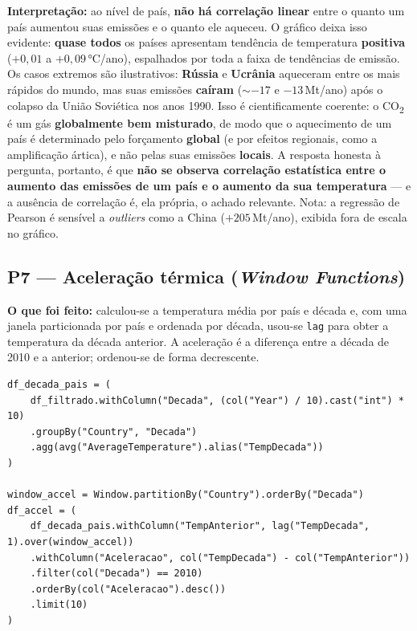 \textbf{Interpretação:} ao nível de país, \textbf{não há correlação linear} entre o quanto
um país aumentou suas emissões e o quanto ele aqueceu. O gráfico deixa isso evidente:
\textbf{quase todos} os países apresentam tendência de temperatura \textbf{positiva}
($+0{,}01$ a $+0{,}09$\,°C/ano), espalhados por toda a faixa de tendências de emissão.
Os casos extremos são ilustrativos: \textbf{Rússia} e \textbf{Ucrânia} aqueceram entre os
mais rápidos do mundo, mas suas emissões \textbf{caíram} ($\sim$$-17$ e $-13$\,Mt/ano)
após o colapso da União Soviética nos anos 1990. Isso é cientificamente coerente: o
CO\textsubscript{2} é um gás \textbf{globalmente bem misturado}, de modo que o aquecimento
de um país é determinado pelo forçamento \textbf{global} (e por efeitos regionais, como a
amplificação ártica), e não pelas suas emissões \textbf{locais}. A resposta honesta à
pergunta, portanto, é que \textbf{não se observa correlação estatística entre o aumento das
emissões de um país e o aumento da sua temperatura} --- e a ausência de correlação é, ela
própria, o achado relevante. Nota: a regressão de Pearson é sensível a \textit{outliers}
como a China ($+205$\,Mt/ano), exibida fora de escala no gráfico.

\subsection{P7 --- Aceleração térmica (\textit{Window Functions})}

\textbf{O que foi feito:} calculou-se a temperatura média por país e década e, com uma
janela particionada por país e ordenada por década, usou-se \texttt{lag} para obter a
temperatura da década anterior. A aceleração é a diferença entre a década de 2010 e a
anterior; ordenou-se de forma decrescente.

\begin{lstlisting}[caption={Aceleração térmica por país via lag em Window Function.},label={lst:p7}]
df_decada_pais = (
    df_filtrado.withColumn("Decada", (col("Year") / 10).cast("int") * 10)
    .groupBy("Country", "Decada")
    .agg(avg("AverageTemperature").alias("TempDecada"))
)

window_accel = Window.partitionBy("Country").orderBy("Decada")
df_accel = (
    df_decada_pais.withColumn("TempAnterior", lag("TempDecada", 1).over(window_accel))
    .withColumn("Aceleracao", col("TempDecada") - col("TempAnterior"))
    .filter(col("Decada") == 2010)
    .orderBy(col("Aceleracao").desc())
    .limit(10)
)
\end{lstlisting}

